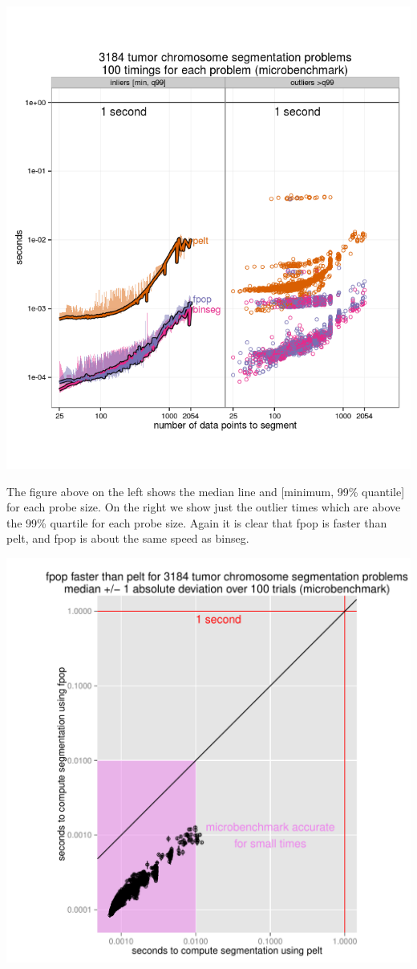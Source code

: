 \documentclass{article}
\begin{document}
\begin{center}
  \includegraphics[width=\textwidth]{figure-microbenchmark-arrays-bands}
\end{center}

The figure above on the left shows the median line and [minimum, 99\%
quantile] for each probe size. On the right we show just the outlier
times which are above the 99\% quartile for each probe size. Again it
is clear that fpop is faster than pelt, and fpop is about the same
speed as binseg.

\begin{center}
  \includegraphics[width=\textwidth]{figure-microbenchmark-arrays-fpop-pelt}
\end{center}
\end{document}
